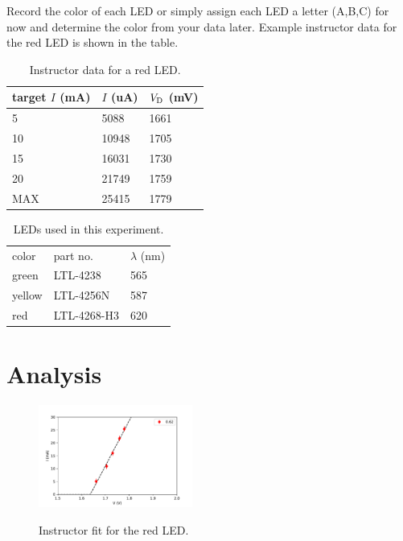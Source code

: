 \documentclass[12pt]{article}
\begin{document}
Record the color of each LED or simply assign each LED a letter
(A,B,C) for now and determine the color from your data later.
Example instructor data for the red LED is shown in the table.

\begin{table}
\begin{center}
\caption{Instructor data for a red LED.}
\begin{tabular}{lll}
target $I$ (mA) & $I$ (uA) & $V_{\rm D}$ (mV) \\
\hline
5    & 5088  & 1661 \\
10   & 10948 & 1705 \\
15   & 16031 & 1730 \\
20   & 21749 & 1759 \\
MAX  & 25415 & 1779 \\
\end{tabular}
\end{center}
\end{table}

\begin{table}[htbp]
\begin{center}
\caption{LEDs used in this experiment.}
\begin{tabular}{lll}
color & part no. & $\lambda$ (nm) \\
green & LTL-4238 & 565 \\  
yellow & LTL-4256N & 587 \\ 
red & LTL-4268-H3 & 620 \\ 
\end{tabular}
\end{center}
\end{table}

\section{Analysis}

\begin{figure}[htbp]
\begin{center}
\includegraphics[width=0.45\textwidth]{figs/instructor_red.pdf} \\
\end{center}
\caption{Instructor fit for the red LED.}
\label{fig:redfit}
\end{figure}
\end{document}
